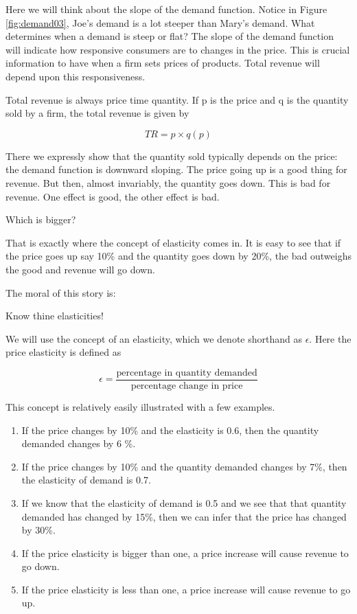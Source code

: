 \documentclass[
]{book}
\providecommand{\tightlist}{%
  \setlength{\itemsep}{0pt}\setlength{\parskip}{0pt}}
\begin{document}
Here we will think about the slope of the demand function. Notice in Figure \ref{fig:demand03}, Joe's demand is a lot steeper than Mary's demand. What determines when a demand is steep or flat? The slope of the demand function will indicate how responsive consumers are to changes in the price. This is crucial information to have when a firm sets prices of products. Total revenue will depend upon this responsiveness.

Total revenue is always price time quantity. If p is the price and q is the quantity sold by a firm, the total revenue is given by

\[TR = p \times q(p)\]

There we expressly show that the quantity sold typically depends on the price: the demand function is downward sloping. The price going up is a good thing for revenue. But then, almost invariably, the quantity goes down. This is bad for revenue. One effect is good, the other effect is bad.

Which is bigger?

That is exactly where the concept of elasticity comes in. It is easy to see that if the price goes up say 10\% and the quantity goes down by 20\%, the bad outweighs the good and revenue will go down.

The moral of this story is:

Know thine elasticities!

We will use the concept of an elasticity, which we denote shorthand as \(\epsilon\). Here the price elasticity is defined as

\[\epsilon=\frac{\text{percentage in quantity demanded}}{\text{percentage change in price}}\]

This concept is relatively easily illustrated with a few examples.

\begin{enumerate}
\def\labelenumi{\arabic{enumi}.}
\tightlist
\item
  If the price changes by 10\% and the elasticity is 0.6, then the quantity demanded changes by 6 \%.
\item
  If the price changes by 10\% and the quantity demanded changes by 7\%, then the elasticity of demand is 0.7.
\item
  If we know that the elasticity of demand is 0.5 and we see that that quantity demanded has changed by 15\%, then we can infer that the price has changed by 30\%.
\item
  If the price elasticity is bigger than one, a price increase will cause revenue to go down.
\item
  If the price elasticity is less than one, a price increase will cause revenue to go up.
\end{enumerate}
\end{document}
